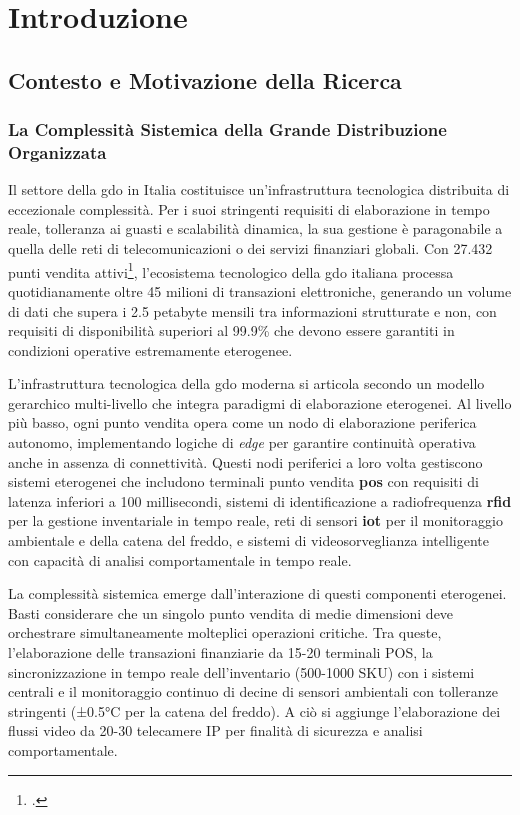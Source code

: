 \chapter{Introduzione}
\label{cap:introduzione}

\section{Contesto e Motivazione della Ricerca}
\label{sec:contesto_motivazione}

\subsection{La Complessità Sistemica della Grande Distribuzione Organizzata}

Il settore della \gls{gdo} in Italia costituisce un'infrastruttura tecnologica distribuita di eccezionale complessità. Per i suoi stringenti requisiti di elaborazione in tempo reale, tolleranza ai guasti e scalabilità dinamica, la sua gestione è paragonabile a quella delle reti di telecomunicazioni o dei servizi finanziari globali.
Con 27.432 punti vendita attivi\footcite{istat2024}, l'ecosistema tecnologico della \gls{gdo} italiana processa quotidianamente oltre 45 milioni di transazioni elettroniche, generando un volume di dati che supera i 2.5 petabyte mensili tra informazioni strutturate e non, con requisiti di disponibilità superiori al 99.9\% che devono essere garantiti in condizioni operative estremamente eterogenee.

L'infrastruttura tecnologica della \gls{gdo} moderna si articola secondo un modello gerarchico multi-livello che integra paradigmi di elaborazione eterogenei. 
Al livello più basso, ogni punto vendita opera come un nodo di elaborazione periferica autonomo, implementando logiche di \textit{\gls{edge}} per garantire continuità operativa anche in assenza di connettività. Questi nodi periferici a loro volta gestiscono sistemi eterogenei che includono terminali punto vendita \textbf{\gls{pos}} con requisiti di latenza inferiori a 100 millisecondi, sistemi di identificazione a radiofrequenza \textbf{\gls{rfid}} per la gestione inventariale in tempo reale, reti di sensori \textbf{\gls{iot}} per il monitoraggio ambientale e della catena del freddo, e sistemi di videosorveglianza intelligente con capacità di analisi comportamentale in tempo reale.

La complessità sistemica emerge dall'interazione di questi componenti eterogenei. Basti considerare che un singolo punto vendita di medie dimensioni deve orchestrare simultaneamente molteplici operazioni critiche. Tra queste, l'elaborazione delle transazioni finanziarie da 15-20 terminali POS, la sincronizzazione in tempo reale dell'inventario (500-1000 SKU) con i sistemi centrali e il monitoraggio continuo di decine di sensori ambientali con tolleranze stringenti (±0.5°C per la catena del freddo). A ciò si aggiunge l'elaborazione dei flussi video da 20-30 telecamere IP per finalità di sicurezza e analisi comportamentale.

